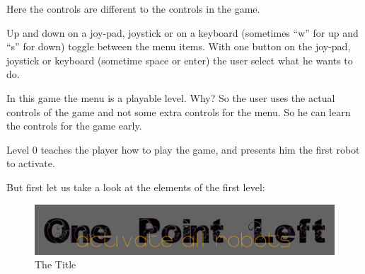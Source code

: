 \documentclass[twopages]{scrartcl}
\begin{document}
Here the controls are different to the controls in the game.

Up and down on a joy-pad, joystick or on a keyboard (sometimes ``w'' for up
and ``s'' for down) toggle between the menu items. With one button on the
joy-pad, joystick or keyboard (sometime space or enter) the user select what
he wants to do.

In this game the menu is a playable level. Why?\newline
So the user uses the actual controls of the game and not some extra controls
for the menu. So he can learn the controls for the game early.

Level 0 teaches the player how to play the game, and presents him the first
robot to activate.

But first let us take a look at the elements of the first level:

\begin{figure}
\begin{center}
\includegraphics{../output_md/assets/img/title.png}
\end{center}
\caption{ The Title }

\end{figure}
\end{document}
